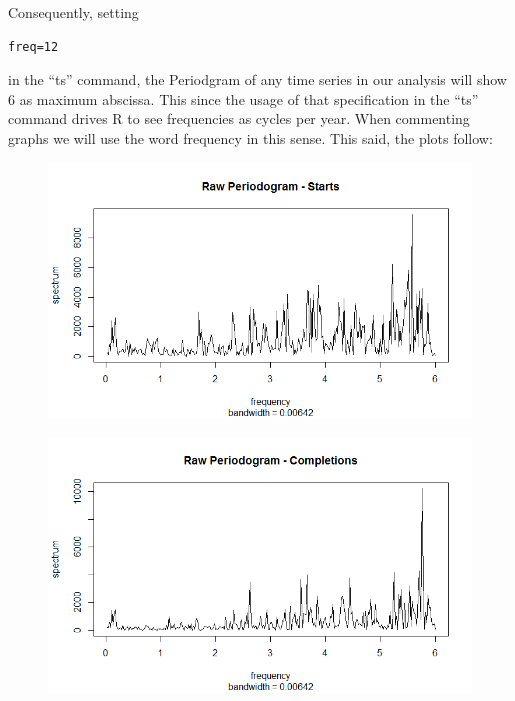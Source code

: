 \documentclass[12pt]{article} %
\begin{document}
Consequently, setting 
\begin{verbatim}
freq=12
\end{verbatim} 
in the ``ts'' command, the Periodgram of any time series in our analysis will show 6 as maximum abscissa. This since the usage of that specification in the ``ts'' command drives R to see frequencies as cycles per year. When commenting graphs we will use the word frequency in this sense.
This said, the plots follow:

\begin{figure}[h!]
\begin{center}
\includegraphics[scale=0.55]{rawspecstart}
\caption{}
\end{center}
\end{figure}

\begin{figure}[h!]
\begin{center}
\includegraphics[scale=0.55]{rawspeccomp}
\caption{}
\end{center}
\end{figure}
\end{document}
